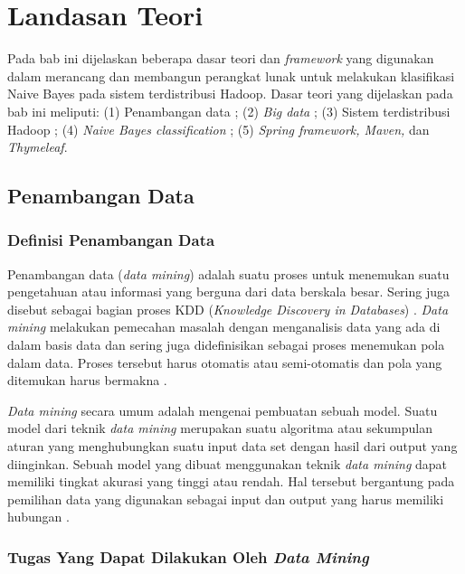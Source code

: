 \chapter{Landasan Teori}

Pada bab ini dijelaskan beberapa dasar teori dan \textit{framework} yang digunakan dalam merancang dan membangun perangkat lunak untuk melakukan klasifikasi Naive Bayes pada sistem terdistribusi Hadoop. Dasar teori yang dijelaskan pada bab ini meliputi: (1) Penambangan data ; (2) \textit{Big data} ; (3) Sistem terdistribusi Hadoop ; (4) \textit{Naive Bayes classification} ; (5) \textit{Spring framework, Maven, } dan \textit{Thymeleaf}. \\

\section{Penambangan Data}

\subsection{Definisi Penambangan Data}
Penambangan data (\textit{data mining}) adalah suatu proses untuk menemukan suatu
pengetahuan atau informasi yang berguna dari data berskala besar. Sering juga
disebut sebagai bagian proses KDD (\textit{Knowledge Discovery in Databases}) \cite{Piateski:1991:KDD:583310}. \textit{Data mining} melakukan pemecahan masalah dengan menganalisis data yang ada di dalam basis data dan sering juga didefinisikan sebagai proses menemukan pola dalam data. Proses tersebut harus otomatis atau semi-otomatis dan pola yang ditemukan harus bermakna \cite{DataMiningIntro:2015}.

\textit{Data mining} secara umum adalah mengenai pembuatan sebuah model. Suatu model dari teknik \textit{data mining} merupakan suatu algoritma atau sekumpulan aturan yang menghubungkan suatu input data set dengan hasil dari output yang diinginkan. Sebuah model yang dibuat menggunakan teknik \textit{data mining} dapat memiliki tingkat akurasi yang tinggi atau rendah. Hal tersebut bergantung pada pemilihan data yang digunakan sebagai input dan output yang harus memiliki hubungan \cite{book:339389}.

\subsection{Tugas Yang Dapat Dilakukan Oleh \textit{Data Mining}}

